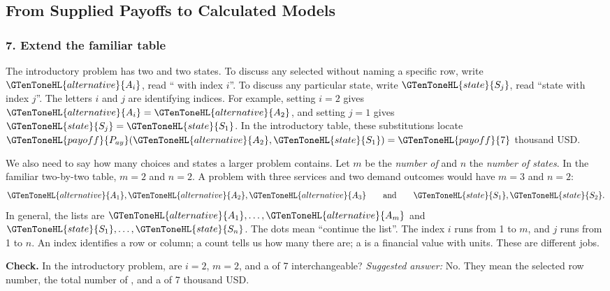 
\subsection{From Supplied Payoffs to Calculated Models}
\label{sec:from-supplied-to-calculated}

\subsubsection*{7. Extend the familiar table}
The introductory problem has two  and two states. To discuss any selected  without naming a specific row, write $\GTenToneHL{alternative}{A_i}$, read `` with index $i$''. To discuss any particular state, write $\GTenToneHL{state}{S_j}$, read ``state with index $j$''. The letters $i$ and $j$ are identifying indices. For example, setting $i=2$ gives $\GTenToneHL{alternative}{A_i}=\GTenToneHL{alternative}{A_2}$, and setting $j=1$ gives $\GTenToneHL{state}{S_j}=\GTenToneHL{state}{S_1}$. In the introductory table, these substitutions locate $\GTenToneHL{payoff}{P_{ay}}(\GTenToneHL{alternative}{A_2},\GTenToneHL{state}{S_1})=\GTenToneHL{payoff}{7}$ thousand USD.

We also need to say how many choices and states a larger problem contains. Let $m$ be the \emph{number of } and $n$ the \emph{number of states}. In the familiar two-by-two table, $m=2$ and $n=2$. A problem with three services and two demand outcomes would have $m=3$ and $n=2$:
\[\GTenToneHL{alternative}{A_1},\GTenToneHL{alternative}{A_2},\GTenToneHL{alternative}{A_3}\qquad\text{and}\qquad \GTenToneHL{state}{S_1},\GTenToneHL{state}{S_2}.\]
In general, the lists are $\GTenToneHL{alternative}{A_1},\ldots,\GTenToneHL{alternative}{A_m}$ and $\GTenToneHL{state}{S_1},\ldots,\GTenToneHL{state}{S_n}$. The dots mean ``continue the list''. The index $i$ runs from 1 to $m$, and $j$ runs from 1 to $n$. An index identifies a row or column; a count tells us how many there are; a  is a financial value with units. These are different jobs.

\textbf{Check.} In the introductory problem, are $i=2$, $m=2$, and a  of 7 interchangeable? \emph{Suggested answer:} No. They mean the selected row number, the total number of , and a  of 7 thousand USD.

